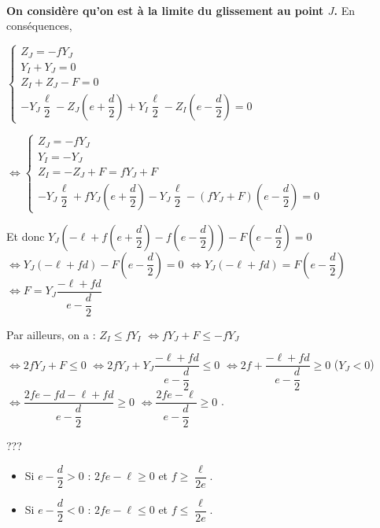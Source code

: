 \begin{corrige}~\\

\textbf{On considère qu'on est à la limite du glissement au point $J$.}
  En conséquences, 

$
\left\{
\begin{array}{l}
Z_J =  -fY_J \\
Y_I + Y_J = 0 \\
Z_I + Z_J -F = 0 \\ 
-Y_J \dfrac{\ell}{2}-Z_J \left(e+\dfrac{d}{2}\right) 
+Y_I \dfrac{\ell}{2}-Z_I \left(e-\dfrac{d}{2}\right) = 0
\end{array}
\right.$

$
\Leftrightarrow 
\left\{
\begin{array}{l}
Z_J =  -fY_J \\
Y_I =- Y_J  \\
Z_I = -Z_J +F  = fY_J +F \\ 
-Y_J \dfrac{\ell}{2}+fY_J \left(e+\dfrac{d}{2}\right) 
-Y_J \dfrac{\ell}{2}-\left(  fY_J +F\right) \left(e-\dfrac{d}{2}\right) = 0
\end{array}
\right.$

Et donc $Y_J\left(- {\ell}+f \left(e+\dfrac{d}{2}\right) 
- f  \left(e-\dfrac{d}{2}\right)\right) 
-F \left(e-\dfrac{d}{2}\right)= 0$
$\Leftrightarrow Y_J\left(- {\ell}+f d\right) -F \left(e-\dfrac{d}{2}\right)= 0$
$\Leftrightarrow Y_J\left(- {\ell}+f d\right) =F \left(e-\dfrac{d}{2}\right)$
$\Leftrightarrow F = Y_J\dfrac{- {\ell}+f d}{e-\dfrac{d}{2}}$

Par ailleurs, on a : 
$Z_I\leq fY_I$ 
$\Leftrightarrow   fY_J +F \leq -f  Y_J$

$\Leftrightarrow   2fY_J +F \leq 0$
$\Leftrightarrow   2fY_J +Y_J\dfrac{- {\ell}+f d}{e-\dfrac{d}{2}} \leq 0$
$\Leftrightarrow   2f +\dfrac{- {\ell}+f d}{e-\dfrac{d}{2}} \geq 0$ ($Y_J<0$)
$\Leftrightarrow   \dfrac{2fe-fd- {\ell}+f d}{e-\dfrac{d}{2}} \geq 0$ 
$\Leftrightarrow   \dfrac{2fe- {\ell}}{e-\dfrac{d}{2}} \geq 0$ . 


???

\begin{itemize}
\item Si $e-\dfrac{d}{2}>0$ : ${2fe- {\ell}} \geq 0$ et  $f \geq \dfrac{{\ell}}{2e}$.
\item Si $e-\dfrac{d}{2}<0$ : ${2fe- {\ell}} \leq 0$ et  $f \leq \dfrac{{\ell}}{2e}$.
\end{itemize}
\end{corrige}



